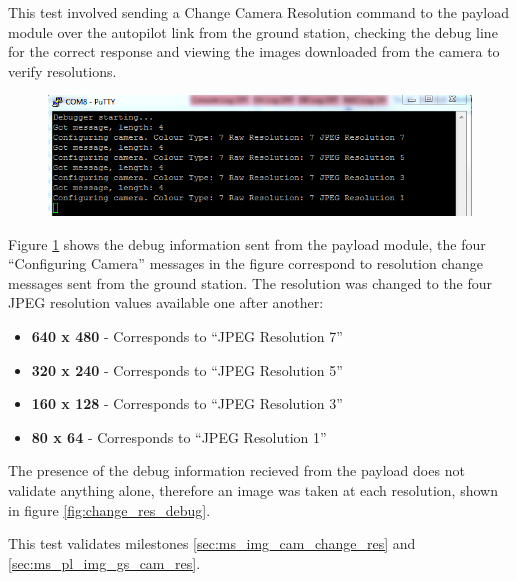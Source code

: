 This test involved sending a Change Camera Resolution command to the payload module over the autopilot link from the ground station, checking the debug line for the correct response and viewing the images downloaded from the camera to verify resolutions.

\begin{figure}[H]
        \centering
        \includegraphics[width=1.00\textwidth]{testing_screenshots/change_res_debug_1.png}
        \label{fig:test_change_res_debug_1}
\end{figure}

Figure \ref{fig:test_change_res_debug_1} shows the debug information sent from the payload module, the four ``Configuring Camera'' messages in the figure correspond to resolution change messages sent from the ground station. The resolution was changed to the four JPEG resolution values available one after another: 
\begin{itemize}
	\item \textbf{640 x 480}  - Corresponds to ``JPEG Resolution 7''
	\item \textbf{320 x 240} - Corresponds to ``JPEG Resolution 5''
	\item \textbf{160 x 128} - Corresponds to ``JPEG Resolution 3''
	\item \textbf{80 x 64} - Corresponds to ``JPEG Resolution 1''
\end{itemize}

The presence of the debug information recieved from the payload does not validate anything alone, therefore an image was taken at each resolution, shown in figure \ref{fig:change_res_debug}.

This test validates milestones \ref{sec:ms_img_cam_change_res} and \ref{sec:ms_pl_img_gs_cam_res}.

